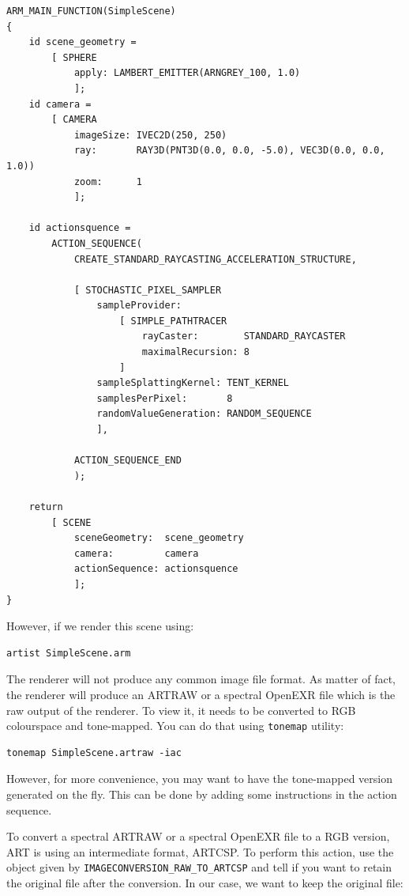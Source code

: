 \documentclass[a4paper,chapterprefix]{scrbook}
\begin{document}
\begin{lstlisting}
ARM_MAIN_FUNCTION(SimpleScene)
{
    id scene_geometry = 
        [ SPHERE 
            apply: LAMBERT_EMITTER(ARNGREY_100, 1.0) 
            ];
    id camera =
        [ CAMERA
            imageSize: IVEC2D(250, 250)
            ray:       RAY3D(PNT3D(0.0, 0.0, -5.0), VEC3D(0.0, 0.0, 1.0))
            zoom:      1
            ];
    
    id actionsquence = 
        ACTION_SEQUENCE(
            CREATE_STANDARD_RAYCASTING_ACCELERATION_STRUCTURE,
    
            [ STOCHASTIC_PIXEL_SAMPLER
                sampleProvider:
                    [ SIMPLE_PATHTRACER
                        rayCaster:        STANDARD_RAYCASTER
                        maximalRecursion: 8
                    ]
                sampleSplattingKernel: TENT_KERNEL
                samplesPerPixel:       8
                randomValueGeneration: RANDOM_SEQUENCE
                ],

            ACTION_SEQUENCE_END
            );
    
    return 
        [ SCENE
            sceneGeometry:  scene_geometry
            camera:         camera
            actionSequence: actionsquence
            ];
}
\end{lstlisting}

However, if we render this scene using:

\begin{verbatim}
artist SimpleScene.arm
\end{verbatim}

The renderer will not produce any common image file format. As matter of fact, the renderer will produce an ARTRAW or a spectral OpenEXR file which is the raw output of the renderer. To view it, it needs to be converted to RGB colourspace and tone-mapped. You can do that using \verb?tonemap? utility:

\begin{verbatim}
tonemap SimpleScene.artraw -iac
\end{verbatim}

However, for more convenience, you may want to have the tone-mapped version generated on the fly. This can be done by adding some instructions in the action sequence.

To convert a spectral ARTRAW or a spectral OpenEXR file to a RGB version, ART is using an intermediate format, ARTCSP. To perform this action, use the object given by \verb?IMAGECONVERSION_RAW_TO_ARTCSP? and tell if you want to retain the original file after the conversion. In our case, we want to keep the original file:
\end{document}
